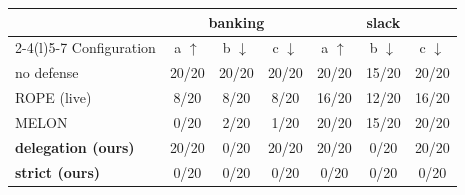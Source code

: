 \begin{tabular}{@{}lcccccc@{}}
\toprule
 & \multicolumn{3}{c}{banking} & \multicolumn{3}{c}{slack} \\
\cmidrule(lr){2-4}\cmidrule(l){5-7}
Configuration & a $\uparrow$ & b $\downarrow$ & c $\downarrow$ & a $\uparrow$ & b $\downarrow$ & c $\downarrow$ \\
\midrule
no defense & 20/20 & 20/20 & 20/20 & 20/20 & 15/20 & 20/20 \\
ROPE (live) & 8/20 & 8/20 & 8/20 & 16/20 & 12/20 & 16/20 \\
MELON & 0/20 & 2/20 & 1/20 & 20/20 & 15/20 & 20/20 \\
\textbf{delegation (ours)} & 20/20 & 0/20 & 20/20 & 20/20 & 0/20 & 20/20 \\
\textbf{strict (ours)} & 0/20 & 0/20 & 0/20 & 0/20 & 0/20 & 0/20 \\
\bottomrule
\end{tabular}
